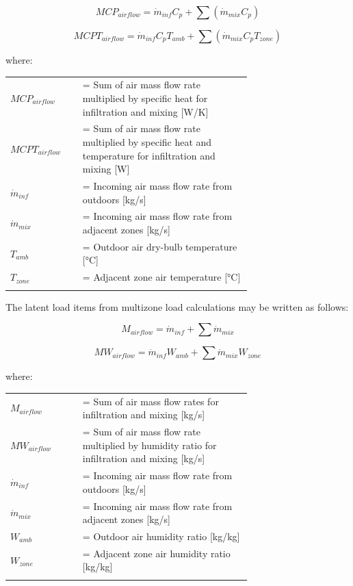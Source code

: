 \begin{equation}
MCP_{airflow} = \dot{m}_{inf} {C_p} + \sum \left( {\dot{m}_{mix} C_p} \right)
\end{equation}

\begin{equation}
MCPT_{airflow} = \dot{m}_{inf} C_p T_{amb} + \sum \left( \dot{m}_{mix} C_p T_{zone} \right)
\end{equation}

where:

\begin{tabular}{lp{0.7\linewidth}}
\\
$MCP_{airflow}$ &= Sum of air mass flow rate multiplied by specific heat for infiltration and mixing [W/K]\\
$MCPT_{airflow}$ &= Sum of air mass flow rate multiplied by specific heat and temperature for infiltration and mixing [W]\\
$\dot{m}_{inf}$ &= Incoming air mass flow rate from outdoors [kg/s]\\
$\dot{m}_{mix}$ &= Incoming air mass flow rate from adjacent zones [kg/s]\\
$T_{amb}$ &= Outdoor air dry-bulb temperature [°C]\\
$T_{zone}$ &= Adjacent zone air temperature [°C]\\
\\
\end{tabular}

The latent load items from multizone load calculations may be written as follows:

\begin{equation}
M_{airflow} = \dot{m}_{inf} + \sum \dot{m}_{mix}
\end{equation}

\begin{equation}
MW_{airflow} = \dot{m}_{inf} W_{amb} + \sum \dot{m}_{mix} W_{zone}
\end{equation}

where:

\begin{tabular}{lp{0.7\linewidth}}
\\
$M_{airflow}$ &= Sum of air mass flow rates for infiltration and mixing [kg/s]\\
$MW_{airflow}$ &= Sum of air mass flow rate multiplied by humidity ratio for infiltration and mixing [kg/s]\\
$\dot{m}_{inf}$ &= Incoming air mass flow rate from outdoors [kg/s]\\
$\dot{m}_{mix}$ &= Incoming air mass flow rate from adjacent zones [kg/s]\\
$W_{amb}$ &= Outdoor air humidity ratio [kg/kg]\\
$W_{zone}$ &= Adjacent zone air humidity ratio [kg/kg]\\
\\
\end{tabular}

